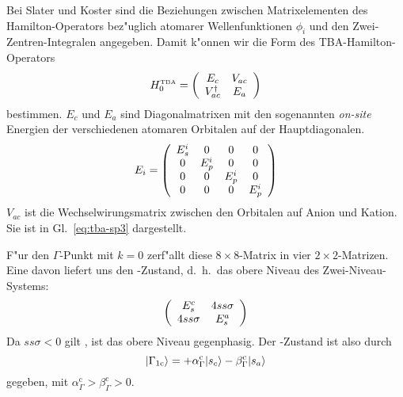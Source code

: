 Bei Slater und Koster \cite{slko:54} sind die Beziehungen zwischen
Matrixelementen des Hamilton-Operators bez"uglich atomarer Wellenfunktionen
$\phi_{i}$ und den Zwei-Zentren-Integralen angegeben. Damit k"onnen wir
die Form des TBA-Hamilton-Operators
%
\begin{equation}
  \label{eq:tba-H}
  \protect H_{0}^{\scriptscriptstyle \text{TBA}} = \left(
  \begin{array}[c]{cc}
    E_{c}       & V_{ac} \\
    V_{ac}^{\dagger} & E_{a}
  \end{array} \right)
\end{equation}
%
bestimmen. $E_{c}$ und $E_{a}$ sind Diagonalmatrixen mit den sogenannten
\emph{on-site} Energien der verschiedenen atomaren Orbitalen auf der
Hauptdiagonalen. 
%
\begin{displaymath}
  E_{i} = \left(
  \begin{array}[c]{cccc}
E_{s}^{i} & 0 & 0 & 0 \\
0 & E_{p}^{i} & 0 & 0 \\
0 & 0 & E_{p}^{i} & 0 \\
0 & 0 & 0 & E_{p}^{i}
  \end{array} \right)
\end{displaymath}
%
$V_{ac}$ ist die Wechselwirungsmatrix zwischen den Orbitalen
auf Anion und Kation. Sie ist in Gl.~\eqref{eq:tba-sp3} dargestellt.

F"ur den $\Gamma$-Punkt mit $k=0$ zerf"allt diese $8\times8$-Matrix in vier
$2\times2$-Matrizen. Eine davon liefert uns den \GCB-Zustand, d.~h.\ das obere
Niveau des Zwei-Niveau-Systems:
%
\begin{displaymath}
  \left(
    \begin{array}[c]{cc}
E_{s}^{c} & 4 ss\sigma \\
4 ss\sigma & E_{s}^{a}
    \end{array}
\right)
\end{displaymath}
%
Da $ss\sigma<0$ gilt \cite{harr:80}, ist das obere Niveau gegenphasig. Der
\GCB-Zustand ist also durch
%
\begin{displaymath}
  | {\Gamma_{1 \text{c}}} \rangle = + \alpha_{\Gamma}^{\text{c}} | {s_{c}} \rangle -
  \beta_{\Gamma}^{\text{c}} | {s_{a}} \rangle
\end{displaymath}
%
gegeben, mit $\alpha_{\Gamma}^{\text{c}} > \beta_{\Gamma}^{\text{c}} >0$.


